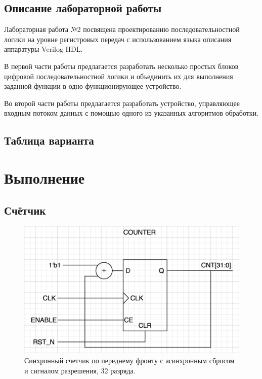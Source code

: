 \documentclass[12pt,onecolumn]{article}
\begin{document}
\subsection{Описание лабораторной работы}

Лабораторная работа №2 посвящена проектированию последовательностной логики на уровне регистровых передач с использованием языка описания аппаратуры Verilog HDL.

В первой части работы предлагается разработать несколько простых блоков цифровой последовательностной логики и объединить их для выполнения заданной функции в одно функционирующее устройство.

Во второй части работы предлагается разработать устройство, управляющее входным потоком данных с помощью одного из указанных алгоритмов обработки.

\subsection{Таблица варианта}
\begin{table}[H]
  \centering
  \end{table}

\section{Выполнение}
\subsection{Счётчик}
\begin{figure}[H]
  \centering
  \includegraphics[width=\textwidth]{image/counter.png}
  \caption{Синхронный счетчик по переднему фронту с асинхронным сбросом и сигналом разрешения, 32 разряда.}
\end{figure}
\end{document}

